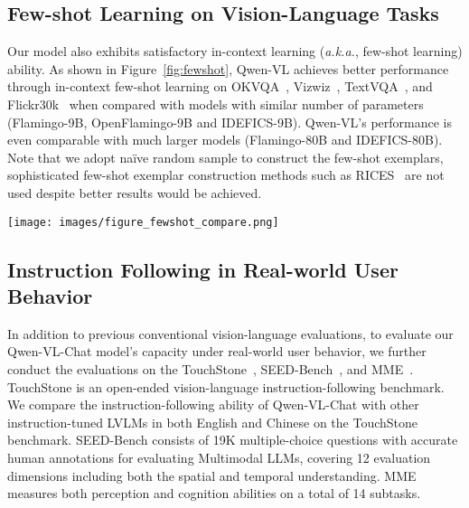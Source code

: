 \documentclass{article}
\begin{document}
\subsection{Few-shot Learning on Vision-Language Tasks}
Our model also exhibits satisfactory in-context learning (\emph{a.k.a.}, few-shot learning) ability. 
As shown in Figure~\ref{fig:fewshot}, Qwen-VL achieves better performance through in-context few-shot learning on OKVQA~\citep{marino2019ok_okvqa}, Vizwiz~\citep{gurari2018vizwiz}, TextVQA~\citep{sidorov2020textcaps}, and Flickr30k~\citep{young2014image_flickr30k} when compared with models with similar number of parameters (Flamingo-9B\citep{alayrac2022flamingo}, OpenFlamingo-9B\citep{awadalla2023openflamingo} and IDEFICS-9B\cite{laurençon2023obelics}). Qwen-VL's performance is even comparable with much larger models (Flamingo-80B and IDEFICS-80B).
Note that we adopt na\"ive random sample to construct the few-shot exemplars, sophisticated few-shot exemplar construction methods such as RICES~\citep{rices} are not used despite better results would be achieved.


\begin{figure*}[ht]
\centering
    \texttt{[image: images/figure\_fewshot\_compare.png]}
   \caption{Few-shot learning results of Qwen-VL in comparison with other models.}
\label{fig:fewshot}
\end{figure*}



\subsection{Instruction Following in Real-world User Behavior}

In addition to previous conventional vision-language evaluations, to evaluate our Qwen-VL-Chat model's capacity under real-world user behavior, we further conduct the evaluations on the TouchStone~\citep{touchstone}, SEED-Bench~\citep{li2023seedbench}, and MME~\citep{fu2023mme}.
TouchStone is an open-ended vision-language instruction-following benchmark.
We compare the instruction-following ability of Qwen-VL-Chat with other instruction-tuned LVLMs in both English and Chinese on the TouchStone benchmark. SEED-Bench consists of 19K multiple-choice questions with accurate human annotations for evaluating Multimodal LLMs, covering 12 evaluation dimensions including both the spatial and temporal understanding. MME measures both perception and cognition abilities on a total of 14 subtasks.
\end{document}
